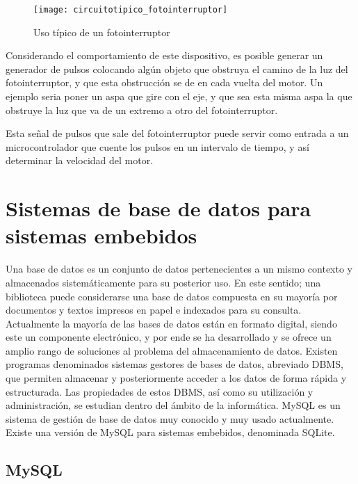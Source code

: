 \begin{figure}[h]
  \centering
  \texttt{[image: circuitotipico\_fotointerruptor]}
  \caption{Uso típico de un fotointerruptor}\label{fig:circuitotipico_fotointerruptor}
\end{figure}

Considerando el comportamiento de este dispositivo, es posible generar un generador de pulsos colocando algún objeto que obstruya el camino de la luz del fotointerruptor, y que esta obstrucción se de en cada vuelta del motor. Un ejemplo seria poner un aspa que gire con el eje, y que sea esta misma aspa la que obstruye la luz que va de un extremo a otro del fotointerruptor.

Esta señal de pulsos que sale del fotointerruptor puede servir como entrada a un microcontrolador que cuente los pulsos en un intervalo de tiempo, y así determinar la velocidad del motor.



\section{Sistemas de base de datos para sistemas embebidos} %
\label{sec:sistemas_de_base_de_datos_para_sistemas_embebidos}

Una base de datos es un conjunto de datos pertenecientes a un mismo contexto y almacenados sistemáticamente para su posterior uso. En este sentido; una biblioteca puede considerarse una base de datos compuesta en su mayoría por documentos y textos impresos en papel e indexados para su consulta. Actualmente la mayoría de las bases de datos están en formato digital, siendo este un componente electrónico, y por ende se ha desarrollado y se ofrece un amplio rango de soluciones al problema del almacenamiento de datos.
Existen programas denominados sistemas gestores de bases de datos, abreviado DBMS, que permiten almacenar y posteriormente acceder a los datos de forma rápida y estructurada. Las propiedades de estos DBMS, así como su utilización y administración, se estudian dentro del ámbito de la informática.
MySQL es un sistema de gestión de base de datos muy conocido y muy usado actualmente. Existe una versión de MySQL para sistemas embebidos, denominada SQLite. 

\subsection{MySQL} %
\label{sub:mysql}

